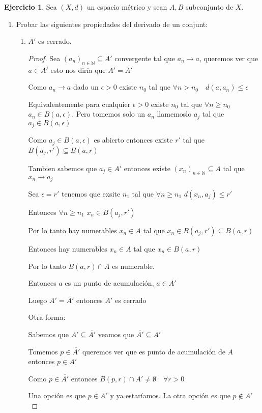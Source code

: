 \documentclass[11pt]{report}
\newcommand{\N}{\mathbb{N}}
\newcommand{\ra}{\rightarrow}
\newcommand{\ol}{\overline}
\theoremstyle{definition}
\newtheorem{ej}{Ejercicio}
\begin{document}
\begin{ej}
  Sea $(X,d)$ un espacio métrico y sean $A,B$ subconjunto de $X$.
  \begin{enumerate}
    \item Probar las siguientes propiedades del derivado de un conjunt:
      \begin{enumerate}
	\item $A'$ es cerrado.
	  \begin{proof}
	    Sea $(a_{n})_{n \in \N} \subseteq A'$ convergente tal que $a_{n} \ra a$, queremos ver que $a \in A'$ esto nos diría que $A' = \ol{A'}$

	    Como $a_{n} \ra a$ dado un $\epsilon > 0$ existe $n_{0}$ tal que $\forall n > n_{0} \quad d(a,a_{n}) \leq \epsilon$

	    Equivalentemente para cualquier $\epsilon > 0$ existe $n_{0}$ tal que $\forall n \geq n_{0}$ $a_{n} \in B(a,\epsilon)$. Pero tomemos solo un $a_{n}$ llamemoslo $a_{j}$ tal que $a_{j} \in B(a,\epsilon)$

	    Como $a_{j} \in B(a,\epsilon)$ es abierto entonces existe $r'$ tal que $B(a_{j},r') \subseteq B(a,r)$

	    Tambien sabemos que $a_{j} \in A'$ entonces existe $(x_{n})_{n \in \N} \subseteq A$ tal que $x_{n} \ra a_{j}$

	    Sea $\epsilon = r'$ tenemos que exsite  $n_{1}$ tal que $\forall n \geq n_{1}$ $d(x_{n}, a_{j}) \leq r'$

	    Entonces $\forall n \geq n_{1}$ $x_{n} \in B(a_{j},r')$

	    Por lo tanto hay numerables $x_{n} \in A$ tal que $x_{n}  \in B(a_{j},r') \subseteq B(a,r)$

	    Entonces hay numerables $x_{n} \in A$ tal que $x_{n} \in B(a,r)$

	    Por lo tanto $B(a,r) \cap A$ es numerable.

	    Entonces $a$ es un punto de acumulación, $a \in A'$

	    Luego $A' = \ol{A'}$ entonces $A'$ es cerrado

	    Otra forma:

	    Sabemos que $A'\subseteq \ol{A'}$ veamos que $\ol{A'} \subseteq A'$

	    Tomemos $p\in\ol{A'}$ queremos ver que es punto de acumulación de $A$ entonces $p \in A'$

	    Como $p \in \ol{A'}$ entonces $B(p,r) \cap A' \neq \emptyset \quad \forall r>0$

	    Una opción es que $p \in A'$ y ya estaríamos. La otra opción es que $p \notin A'$


\end{proof}
\end{enumerate}
\end{enumerate}
\end{ej}
\end{document}

